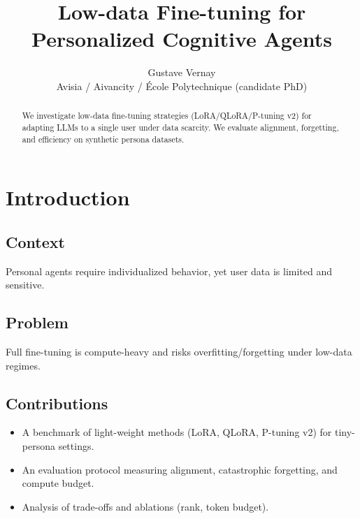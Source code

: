 \documentclass[10pt]{article}
\title{Low-data Fine-tuning for Personalized Cognitive Agents}
\author{Gustave Vernay \\ Avisia / Aivancity / \'{E}cole Polytechnique (candidate PhD)}
\date{}
\begin{document}
\maketitle

\begin{abstract}
We investigate low-data fine-tuning strategies (LoRA/QLoRA/P-tuning v2) for adapting LLMs to a single user under data scarcity. We evaluate alignment, forgetting, and efficiency on synthetic persona datasets.
\end{abstract}

\section{Introduction}
\subsection{Context}
Personal agents require individualized behavior, yet user data is limited and sensitive.

\subsection{Problem}
Full fine-tuning is compute-heavy and risks overfitting/forgetting under low-data regimes.

\subsection{Contributions}
\begin{itemize}
	\item A benchmark of light-weight methods (LoRA, QLoRA, P-tuning v2) for tiny-persona settings.
	\item An evaluation protocol measuring alignment, catastrophic forgetting, and compute budget.
	\item Analysis of trade-offs and ablations (rank, token budget).
\end{itemize}

\end{document}
